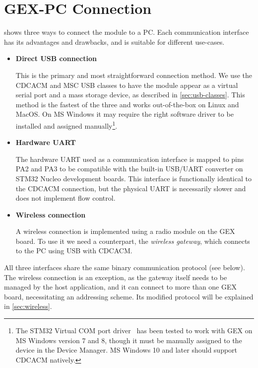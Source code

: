 \section{GEX-PC Connection}

 shows three ways to connect the module to a \gls{PC}. Each communication interface has its advantages and drawbacks, and is suitable for different use-cases.

\begin{itemize}
	\item \textbf{Direct \gls{USB} connection}
		
		This is the primary and most straightforward connection method. We use the \gls{CDCACM} and \gls{MSC} \gls{USB} classes to have the module appear as a virtual serial port and a mass storage device, as described in \cref{sec:usb-classes}. This method is the fastest of the three and works out-of-the-box on Linux and MacOS. On MS Windows it may require the right software driver to be installed and assigned manually\footnote{The STM32 Virtual COM port driver~\cite{stm-vcom} has been tested to work with GEX on MS Windows version 7 and 8, though it must be manually assigned to the device in the Device Manager. MS Windows 10 and later should support \gls{CDCACM} natively.}.
	
	\item \textbf{Hardware \gls{UART}}
	
		The hardware UART used as a communication interface is mapped to pins PA2 and PA3 to be compatible with the built-in \gls{USB}/\gls{UART} converter on STM32 Nucleo development boards. This interface is functionally identical to the \gls{CDCACM} connection, but the physical \gls{UART} is necessarily slower and does not implement flow control.
		
	\item \textbf{Wireless connection}
	
		A wireless connection is implemented using a radio module on the GEX board. To use it we need a counterpart, the \textit{wireless gateway}, which connects to the \gls{PC} using \gls{USB} with \gls{CDCACM}.
	
\end{itemize}

All three interfaces share the same binary communication protocol (see below). The wireless connection is an exception, as the gateway itself needs to be managed by the host application, and it can connect to more than one GEX board, necessitating an addressing scheme. Its modified protocol will be explained in \cref{sec:wireless}.

